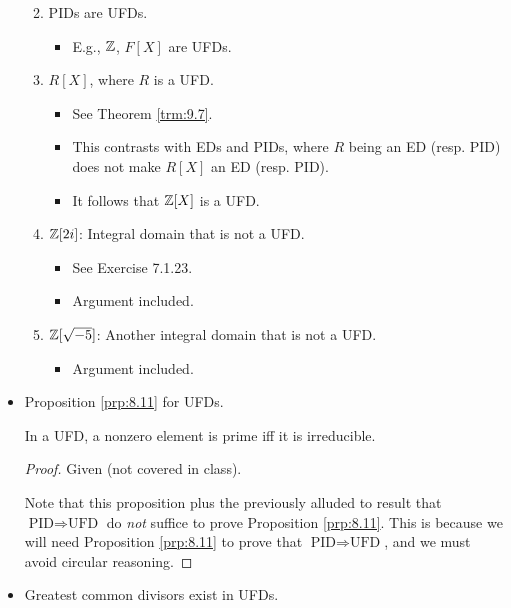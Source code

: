 \documentclass[../notes.tex]{subfiles}
\begin{document}
\begin{itemize}
\begin{enumerate}
\begin{itemize}
        \end{itemize}
        \item PIDs are UFDs.
        \begin{itemize}
            \item E.g., $\mathbb{Z}$, $F[X]$ are UFDs.
        \end{itemize}
        \item $R[X]$, where $R$ is a UFD.
        \begin{itemize}
            \item See Theorem \ref{trm:9.7}.
            \item This contrasts with EDs and PIDs, where $R$ being an ED (resp. PID) does not make $R[X]$ an ED (resp. PID).
            \item It follows that $\mathbb{Z}[X]$ is a UFD.
        \end{itemize}
        \item $\mathbb{Z}[2i]$: Integral domain that is not a UFD.
        \begin{itemize}
            \item See Exercise 7.1.23.
            \item Argument included.
        \end{itemize}
        \item $\mathbb{Z}[\sqrt{-5}]$: Another integral domain that is not a UFD.
        \begin{itemize}
            \item Argument included.
        \end{itemize}
    \end{enumerate}
    \item Proposition \ref{prp:8.11} for UFDs.
    \begin{proposition}\label{prp:8.12}
        In a UFD, a nonzero element is prime iff it is irreducible.
        \begin{proof}
            Given (not covered in class).\par
            Note that this proposition plus the previously alluded to result that $\text{PID}\Longrightarrow\text{UFD}$ do \emph{not} suffice to prove Proposition \ref{prp:8.11}. This is because we will need Proposition \ref{prp:8.11} to prove that $\text{PID}\Longrightarrow\text{UFD}$, and we must avoid circular reasoning.
        \end{proof}
    \end{proposition}
    \item Greatest common divisors exist in UFDs.
    \begin{proposition}\label{prp:8.13}

\end{proposition}
\end{itemize}
\end{document}
